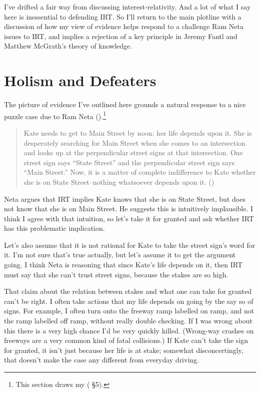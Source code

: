 \documentclass[
  10pt,
  letterpaper,
  twoside]{scrbook}
\begin{document}
I've drifted a fair way from discussing interest-relativity. And a lot
of what I say here is inessential to defending IRT. So I'll return to
the main plotline with a discussion of how my view of evidence helps
respond to a challenge Ram Neta issues to IRT, and implies a rejection
of a key principle in Jeremy Fantl and Matthew McGrath's theory of
knowledge.

\section{Holism and Defeaters}\label{sec-neta}

The picture of evidence I've outlined here grounds a natural response to
a nice puzzle case due to Ram Neta
().\footnote{This section draws my
  ( §5).}

\begin{quote}
Kate needs to get to Main Street by noon: her life depends upon it. She
is desperately searching for Main Street when she comes to an
intersection and looks up at the perpendicular street signs at that
intersection. One street sign says ``State Street'' and the
perpendicular street sign says ``Main Street.'' Now, it is a matter of
complete indifference to Kate whether she is on State Street--nothing
whatsoever depends upon it. ()
\end{quote}

Neta argues that IRT implies Kate knows that she is on State Street, but
does not know that she is on Main Street. He suggests this is
intuitively implausible. I think I agree with that intuition, so let's
take it for granted and ask whether IRT has this problematic
implication.

Let's also assume that it is not rational for Kate to take the street
sign's word for it. I'm not sure that's true actually, but let's assume
it to get the argument going. I think Neta is reasoning that since
Kate's life depends on it, then IRT must say that she can't trust street
signs, because the stakes are so high.

That claim about the relation between stakes and what one can take for
granted can't be right. I often take actions that my life depends on
going by the say so of signs. For example, I often turn onto the freeway
ramp labelled on ramp, and not the ramp labelled off ramp, without
really double checking. If I was wrong about this there is a very high
chance I'd be very quickly killed. (Wrong-way crashes on freeways are a
very common kind of fatal collisions.) If Kate can't take the sign for
granted, it isn't just because her life is at stake; somewhat
disconcertingly, that doesn't make the case any different from everyday
driving.
\end{document}
